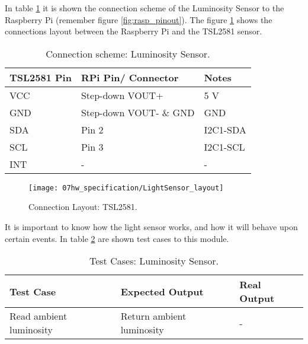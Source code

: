 
In table \ref{table:connect_lightsensor} it is shown the connection scheme of the Luminosity Sensor to the Raspberry Pi (remember figure \ref{fig:rasp_pinout}). The figure \ref{fig:LightLayout} shows the connections layout between the Raspberry Pi and the TSL2581 sensor.

\begin{table}[H]
	\centering
	\begin{tabular}{|m{3cm}|m{5cm}|m{3cm}|}
		\hline
		\textbf{TSL2581 Pin} & \textbf{RPi Pin/ Connector} & \textbf{Notes} 
		\\\hline\hline
		VCC & Step-down VOUT+ & 5 V
		\\\hline
		GND & Step-down VOUT- \& GND & GND
		\\\hline
		SDA & Pin 2 & I2C1-SDA
		\\\hline
		SCL & Pin 3 & I2C1-SCL
		\\\hline
		INT & - & -
		\\\hline
	\end{tabular}
	
	\caption{Connection scheme: Luminosity Sensor.}
	\label{table:connect_lightsensor}
\end{table}

\begin{figure}[H]
	\centering
	\texttt{[image: 07hw\_specification/LightSensor\_layout]}
	\caption{Connection Layout: TSL2581.}
	\label{fig:LightLayout}
\end{figure}


It is important to know how the light sensor works, and how it will behave upon certain events. In table \ref{table:test_light_sen} are shown test cases to this module.

\begin{table}[H]
	\centering
	\resizebox{\columnwidth}{!}
	{
		\begin{tabular}{|m{3cm}|m{5cm}||m{5cm}|}
			\hline
			\textbf{Test Case} & \textbf{Expected Output} & \textbf{Real Output}
			\\\hline\hline
			Read ambient luminosity & Return ambient luminosity  & -
			\\\hline
		\end{tabular}
	}
	\caption{Test Cases: Luminosity Sensor.}
	\label{table:test_light_sen}
\end{table}

